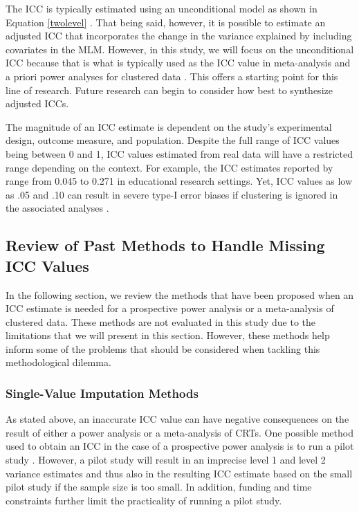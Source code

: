 The ICC is typically estimated using an unconditional model as shown in Equation \ref{twolevel} \cite{hedgesEffectSizesClusterRandomized2007, hedges2013}.  That being said, however, it is possible to estimate an adjusted ICC that incorporates the change in the variance explained by including covariates in the MLM. However, in this study, we will focus on the unconditional ICC because that is what is typically used as the ICC value in meta-analysis and a priori power analyses for clustered data \cite{taylor2021}. This offers a starting point for this line of research. Future research can begin to consider how best to synthesize adjusted ICCs. 

The magnitude of an ICC estimate is dependent on the study's experimental design, outcome measure, and population. Despite the full range of ICC values being between 0 and 1, ICC values estimated from real data will have a restricted range depending on the context. For example, the ICC estimates reported by  range from 0.045 to 0.271 in educational research settings. Yet, ICC values as low as .05 and .10 can result in severe type-I error biases if clustering is ignored in the associated analyses \cite{hox2001, muthen1995}. 



\subsection{Review of Past Methods to Handle Missing ICC Values}
In the following section, we review the methods that have been proposed when an ICC estimate is needed for a prospective power analysis or a meta-analysis of clustered data. These methods are not evaluated in this study due to the limitations that we will present in this section. However, these methods help inform some of the problems that should be considered when tackling this methodological dilemma. 

\subsubsection{Single-Value Imputation Methods}
As stated above, an inaccurate ICC value can have negative consequences on the result of either a power analysis or a meta-analysis of CRTs. One possible method used to obtain an ICC in the case of a prospective power analysis is to run a pilot study \cite{rhoads}. However, a pilot study will result in an imprecise level 1 and level 2 variance estimates and thus also in the resulting ICC estimate based on the small pilot study if the sample size is too small. In addition, funding and time constraints further limit the practicality of running a pilot study. 

